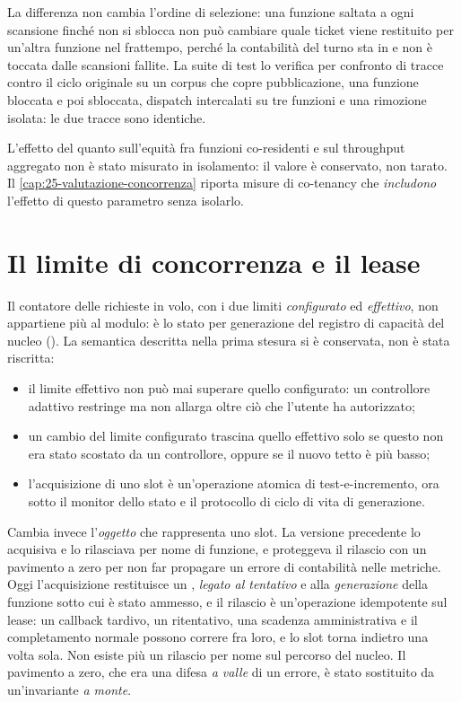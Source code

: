 La differenza non cambia l'ordine di selezione: una funzione saltata a ogni
scansione finch\'e non si sblocca non pu\`o cambiare quale ticket viene restituito per
un'altra funzione nel frattempo, perch\'e la contabilit\`a del turno sta in
 e non \`e toccata dalle scansioni fallite. La suite di test lo verifica
per confronto di tracce contro il ciclo originale su un corpus che copre
pubblicazione, una funzione bloccata e poi sbloccata, dispatch intercalati su tre
funzioni e una rimozione isolata: le due tracce sono identiche.

\begin{damisurare}
L'effetto del quanto sull'equit\`a fra funzioni co-residenti e sul throughput
aggregato non \`e stato misurato in isolamento: il valore \`e conservato, non
tarato. Il \cref{cap:25-valutazione-concorrenza} riporta misure di co-tenancy che
\emph{includono} l'effetto di questo parametro senza isolarlo.
\end{damisurare}

\section{Il limite di concorrenza e il lease}
\label{sec:09-lease}

Il contatore delle richieste in volo, con i due limiti \emph{configurato} ed
\emph{effettivo}, non appartiene pi\`u al modulo: \`e lo stato per generazione del
registro di capacit\`a del nucleo (). La semantica
descritta nella prima stesura si \`e conservata, non \`e stata riscritta:

\begin{itemize}[leftmargin=*]
  \item il limite effettivo non pu\`o mai superare quello configurato: un
  controllore adattivo restringe ma non allarga oltre ci\`o che l'utente ha
  autorizzato;
  \item un cambio del limite configurato trascina quello effettivo solo se questo
  non era stato scostato da un controllore, oppure se il nuovo tetto \`e pi\`u basso;
  \item l'acquisizione di uno slot \`e un'operazione atomica di test-e-incremento,
  ora sotto il monitor dello stato e il protocollo di ciclo di vita di generazione.
\end{itemize}

Cambia invece l'\emph{oggetto} che rappresenta uno slot. La versione precedente
lo acquisiva e lo rilasciava per nome di funzione, e proteggeva il rilascio con un
pavimento a zero per non far propagare un errore di contabilit\`a nelle metriche.
Oggi l'acquisizione restituisce un , \emph{legato al tentativo}
e alla \emph{generazione} della funzione sotto cui \`e stato ammesso, e il rilascio
\`e un'operazione idempotente sul lease: un callback tardivo, un ritentativo, una
scadenza amministrativa e il completamento normale possono correre fra loro, e lo
slot torna indietro una volta sola. Non esiste pi\`u un rilascio per nome sul
percorso del nucleo. Il pavimento a zero, che era una difesa \emph{a valle} di un
errore, \`e stato sostituito da un'invariante \emph{a monte}.

